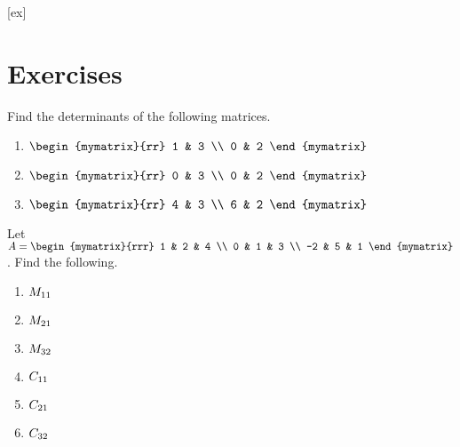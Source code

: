 [ex]
\section*{Exercises}

\begin{enumialphparenastyle}

\begin{ex} Find the determinants of the following matrices.

\begin{enumerate}
\item $\begin{mymatrix}{rr}
1 & 3 \\
0 & 2
\end{mymatrix}$

\item $\begin{mymatrix}{rr}
0 & 3 \\
0 & 2
\end{mymatrix}$

\item $\begin{mymatrix}{rr}
4 & 3 \\
6 & 2
\end{mymatrix}$
\end{enumerate}
\end{ex}

\begin{ex} Let $A = \begin{mymatrix}{rrr}
1 & 2 & 4 \\
0 & 1 & 3 \\
-2 & 5 & 1 
\end{mymatrix}$. Find the following.
\begin{enumerate}
\item $\minor{A}{11}$
\item $\minor{A}{21}$
\item $\minor{A}{32}$
\item $\cofactor{A}{11}$
\item $\cofactor{A}{21}$
\item $\cofactor{A}{32}$
\end{enumerate}
\end{ex}


\end{enumialphparenastyle}
